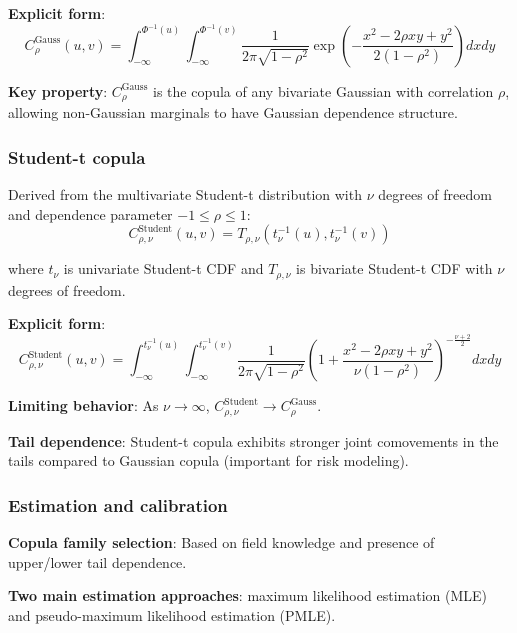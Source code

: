 \documentclass[12pt,a4paper]{article}
\begin{document}
\textbf{Explicit form}:
\[
C_\rho^{\text{Gauss}}(u,v) = \int_{-\infty}^{\Phi^{-1}(u)} \int_{-\infty}^{\Phi^{-1}(v)} \frac{1}{2\pi\sqrt{1-\rho^2}} \exp\left(-\frac{x^2 - 2\rho xy + y^2}{2(1-\rho^2)}\right) dxdy
\]

\textbf{Key property}: $C_\rho^{\text{Gauss}}$ is the copula of any bivariate Gaussian with correlation $\rho$, allowing non-Gaussian marginals to have Gaussian dependence structure.

\vspace{0.5em}

\subsubsection{Student-t copula}

Derived from the multivariate Student-t distribution with $\nu$ degrees of freedom and dependence parameter $-1 \leq \rho \leq 1$:
\[
C_{\rho,\nu}^{\text{Student}}(u,v) = T_{\rho,\nu}(t_\nu^{-1}(u), t_\nu^{-1}(v))
\]

where $t_\nu$ is univariate Student-t CDF and $T_{\rho,\nu}$ is bivariate Student-t CDF with $\nu$ degrees of freedom.

\textbf{Explicit form}:
\[
C_{\rho,\nu}^{\text{Student}}(u,v) = \int_{-\infty}^{t_\nu^{-1}(u)} \int_{-\infty}^{t_\nu^{-1}(v)} \frac{1}{2\pi\sqrt{1-\rho^2}} \left(1 + \frac{x^2 - 2\rho xy + y^2}{\nu(1-\rho^2)}\right)^{-\frac{\nu+2}{2}} dxdy
\]

\textbf{Limiting behavior}: As $\nu \to \infty$, $C_{\rho,\nu}^{\text{Student}} \to C_\rho^{\text{Gauss}}$.

\textbf{Tail dependence}: Student-t copula exhibits stronger joint comovements in the tails compared to Gaussian copula (important for risk modeling).

\vspace{0.5em}

\subsubsection{Estimation and calibration}

\textbf{Copula family selection}: Based on field knowledge and presence of upper/lower tail dependence.

\vspace{0.5em}

\textbf{Two main estimation approaches}: maximum likelihood estimation (MLE) and pseudo-maximum likelihood estimation (PMLE).

\vspace{0.5em}
\end{document}
